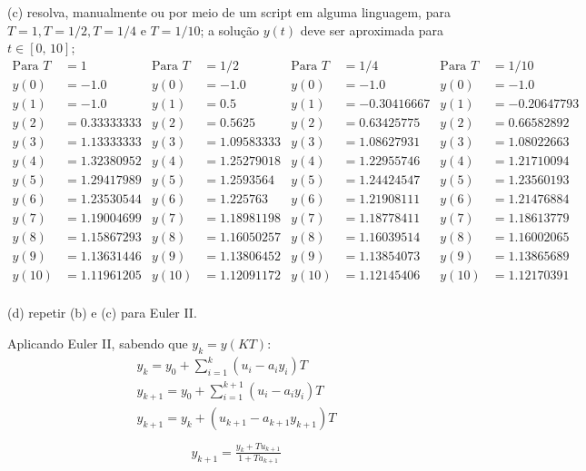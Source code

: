 \documentclass[10pt]{article}
\begin{document}
(c) resolva, manualmente ou por meio de um script em alguma linguagem, para $T = 1, T = 1/2, T = 1/4$ e $T = 1/10$; a solução $y(t)$ deve ser aproximada para $t \in [0, \, 10]$;
\begin{align*}
    \text{Para } T &= 1  & \text{Para } T &= 1/2   &  \text{Para } T &= 1/4       & \text{Para } T &= 1/10\\
    y(0) &= -1.0        & y(0)  &= -1.0        &  y(0) &= -1.0             &  y(0) &= -1.0\\
    y(1) &= -1.0        & y(1)  &= 0.5         &  y(1) &= -0.30416667      &  y(1) &= -0.20647793\\
    y(2) &= 0.33333333  & y(2)  &= 0.5625      &  y(2) &= 0.63425775       &  y(2) &= 0.66582892\\
    y(3) &= 1.13333333  & y(3)  &= 1.09583333  &  y(3) &= 1.08627931       &  y(3) &= 1.08022663\\
    y(4) &= 1.32380952  & y(4)  &= 1.25279018  &  y(4) &= 1.22955746       &  y(4) &= 1.21710094\\
    y(5) &= 1.29417989  & y(5)  &= 1.2593564   &  y(5) &= 1.24424547       &  y(5) &= 1.23560193\\
    y(6) &= 1.23530544  & y(6)  &= 1.225763    &  y(6) &= 1.21908111       &  y(6) &= 1.21476884\\
    y(7) &= 1.19004699  & y(7)  &= 1.18981198  &  y(7) &= 1.18778411       &  y(7) &= 1.18613779\\
    y(8) &= 1.15867293  & y(8)  &= 1.16050257  &  y(8) &= 1.16039514       &  y(8) &= 1.16002065\\
    y(9) &= 1.13631446  & y(9)  &= 1.13806452  &  y(9) &= 1.13854073       &  y(9) &= 1.13865689\\
    y(10) &= 1.11961205 & y(10) &= 1.12091172  &  y(10) &= 1.12145406      &  y(10) &= 1.12170391\\
\end{align*}

(d) repetir (b) e (c) para Euler II.

Aplicando Euler II, sabendo que $ y_k = y(KT) $:
\begin{align*}
    y_k = y_0 + \sum_{i=1}^{k} (u_i - a_i y_i)T\\
    y_{k+1} = y_0 + \sum_{i=1}^{k+1} (u_i - a_i y_i)T\\
    y_{k+1} = y_k + (u_{k+1} - a_{k+1} y_{k+1})T\\
\end{align*}
\begin{align*}
    y_{k+1} = \frac{y_k + Tu_{k+1}}{1 + Ta_{k+1}}
\end{align*}
\end{document}
